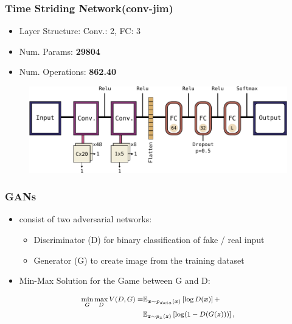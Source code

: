 \begin{frame}
  \frametitle{Time Striding Network(conv-jim)}
  \vspace{-0.5cm}
  \begin{itemize}
    \small
    \item Layer Structure: Conv.: 2, FC: 3
    \item Num. Params: \textbf{\num{29804}}
    \item Num. Operations: \textbf{\SI{862.40}{\kilo\ops}}
  \end{itemize}
  \begin{figure} \includegraphics[height=0.35\textheight]{../4_nn/figs/nn_arch_cnn_jim.pdf} \end{figure}
\end{frame}


\begin{frame}
  \frametitle{GANs}
  \vspace{-0.5cm}
  \begin{itemize}
    \small
    \item consist of two adversarial networks:
    \begin{itemize}
      \item Discriminator (D) for binary classification of fake / real input
      \item Generator (G) to create image from the training dataset
    \end{itemize}
    \item Min-Max Solution for the Game between G and D:
  \end{itemize}
  \begin{equation*}
    \footnotesize
    \begin{aligned}
      \underset{G}{\min} \, \underset{D}{\max} \, V(D, G) = & \mathbb{E}_{\bm{x} \sim p_{data}(\bm{x})}\left[ \log D(\bm{x}) \right] + \\
      & \mathbb{E}_{\bm{z} \sim p_{\bm{z}}(\bm{z})}\left[ \log (1 - D(G(\bm{z}))) \right],
    \end{aligned}
  \end{equation*}
\end{frame}


